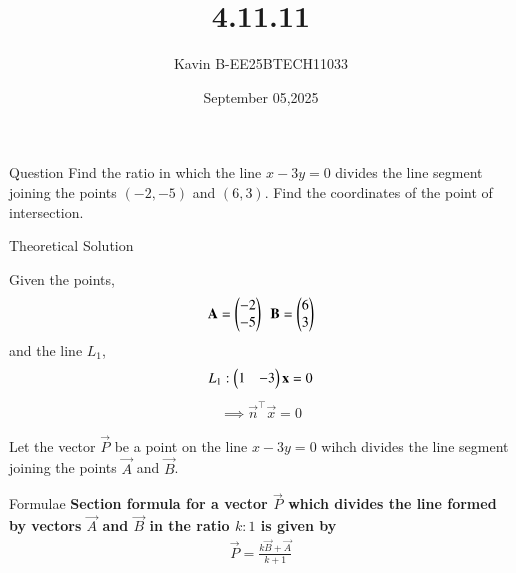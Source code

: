 \documentclass{beamer}
\begin{document}
\title 
{4.11.11}
\date{September 05,2025}


\author 
{Kavin B-EE25BTECH11033}






\frame{\titlepage}
\begin{frame}{Question}
Find the ratio in which the line $x - 3y = 0$ divides the line segment joining the points $(-2, -5)$ and $(6, 3)$. Find the coordinates of the point of intersection.\\
\end{frame}



\begin{frame}{Theoretical Solution}

Given the points,
\begin{align}
    \vec{A}=\begin{myvec}{-2\\-5}\end{myvec}\ \ 
    \vec{B}=\begin{myvec}{6\\3}\end{myvec}
\end{align}
and the line $L_1$,
\begin{align}
    L_1: \begin{pmatrix}1 & -3\end{pmatrix}\mathbf{x} = 0
\end{align}
\begin{align}
    \implies \vec{n}^{\top}\vec{x}=0
\end{align}
\bigskip

Let the vector $\vec{P}$ be a point on the line $x - 3y = 0$ wihch divides the line segment joining the points $\vec{A}$ and $\vec{B}$.\\
\end{frame}

\begin{frame}{Formulae}
\textbf{Section formula for a vector $\vec{P}$ which divides the line formed by vectors $\vec{A}$ and $\vec{B}$ in the ratio $k:1$ is given by}
\begin{align}
    \vec{P}=\frac{k\vec{B}+\vec{A}}{k+1}
\end{align}
\end{frame}
\end{document}
